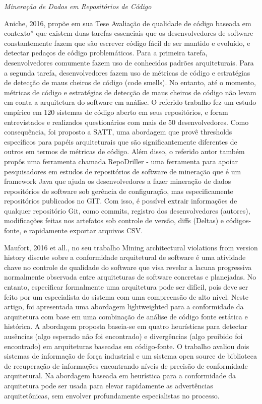 \documentclass[
	12pt,				%
	openright,			%
	twoside,			%
	a4paper,			%
	english,			%
	french,				%
	spanish,			%
	brazil,				%
	]{abntex2}
\begin{document}
\emph{Mineração de Dados em Repositórios de Código }

Aniche, 2016, propõe em sua Tese \textquotedbl{}Avaliação de qualidade
de código baseada em contexto\textquotedblright{} que existem duas
tarefas essenciais que os desenvolvedores de software constantemente
fazem que são escrever código fácil de ser mantido e evoluído, e detectar
pedaços de código problemáticos. Para a primeira tarefa, desenvolvedores
comumente fazem uso de conhecidos padrões arquiteturais. Para a segunda
tarefa, desenvolvedores fazem uso de métricas de código e estratégias
de detecção de maus cheiros de código (code smells). No entanto, até
o momento, métricas de código e estratégias de detecção de maus cheiros
de código não levam em conta a arquitetura do software em análise.
O referido trabalho fez um estudo empírico em 120 sistemas de código
aberto em seus repositórios, e foram entrevistados e realizados questionários
com mais de 50 desenvolvedores. Como consequência, foi proposto a
SATT, uma abordagem que provê thresholds específicos para papéis arquiteturais
que são significantemente diferentes de outros em termos de métricas
de código. Além disso, o referido autor também propôs uma ferramenta
chamada RepoDriller - uma ferramenta para apoiar pesquisadores em
estudos de repositórios de software de mineração que é um framework
Java que ajuda os desenvolvedores a fazer mineração de dados repositórios
de software sob gerência de configuração, mas especificamente repositórios
publicados no GIT. Com isso, é possível extrair informações de qualquer
repositório Git, como commits, registro dos desenvolvedores (autores),
modificações feitas nos artefatos sob controle de versão, diffs (Deltas)
e códigos-fonte, e rapidamente exportar arquivos CSV. 

Maufort, 2016 et all., no seu trabalho \textquotedbl{}Mining architectural
violations from version history\textquotedbl{} discute sobre a conformidade
arquitetural de software é uma atividade chave no controle de qualidade
do software que visa revelar a lacuna progressiva normalmente observada
entre arquiteturas de software concretas e planejadas. No entanto,
especificar formalmente uma arquitetura pode ser difícil, pois deve
ser feito por um especialista do sistema com uma compreensão de alto
nível. Neste artigo, foi apresentada uma abordagem \textquotedbl{}lightweighted\textquotedbl{}
para a conformidade da arquitetura com base em uma combinação de análise
de código fonte estática e histórica. A abordagem proposta baseia-se
em quatro heurísticas para detectar ausências (algo esperado não foi
encontrado) e divergências (algo proibido foi encontrado) em arquiteturas
baseadas em código-fonte. O trabalho avaliou dois sistemas de informação
de força industrial e um sistema open source de biblioteca de recuperação
de informações encontrando níveis de precisão de conformidade arquitetural.
Na abordagem baseada em heurística para a conformidade da arquitetura
pode ser usada para elevar rapidamente as advertências arquitetônicas,
sem envolver profundamente especialistas no processo.
\end{document}
